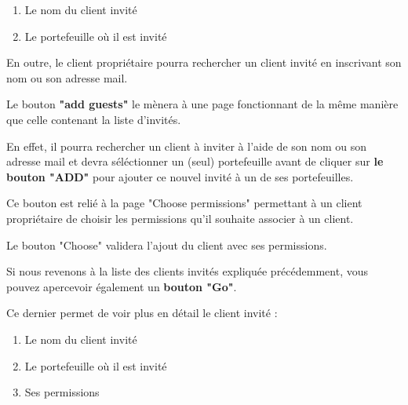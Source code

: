 \begin{enumerate}
\item Le nom du client invité
\item Le portefeuille où il est invité
\end{enumerate}

\begin{flushleft}
En outre, le client propriétaire pourra rechercher un client invité en inscrivant son nom ou son adresse mail.
\end{flushleft}

\begin{flushleft}
Le bouton \textbf{"add guests"} le mènera à une page fonctionnant de la même manière que celle contenant la liste d'invités.
\end{flushleft}

\begin{flushleft}
En effet, il pourra rechercher un client à inviter à l'aide de  son nom ou son adresse mail et devra séléctionner un (seul) portefeuille avant de cliquer sur \textbf{le bouton "ADD"} pour ajouter ce nouvel invité à un de ses portefeuilles.
\end{flushleft}

\begin{flushleft}
Ce bouton est relié à la page "Choose permissions" permettant à un client propriétaire de choisir les permissions qu'il souhaite associer à un client. 
\end{flushleft}

\begin{flushleft}
Le bouton "Choose" validera l'ajout du client avec ses permissions.
\end{flushleft}

\begin{flushleft}
Si nous revenons à la liste des clients invités expliquée précédemment, vous pouvez apercevoir également un \textbf{bouton "Go"}. 
\end{flushleft}

\begin{flushleft}
Ce dernier permet de voir plus en détail le client invité :
\end{flushleft}

\begin{enumerate}
\item Le nom du client invité
\item Le portefeuille où il est invité
\item Ses permissions
\end{enumerate}

